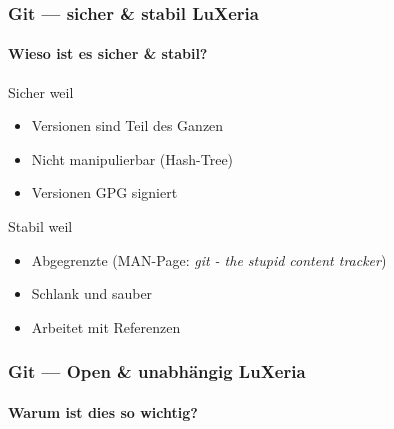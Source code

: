 \begin{frame}
	\frametitle{Git --- sicher \& stabil \hfill{} LuXeria}
	\framesubtitle{Wieso ist es sicher \& stabil?}
	\begin{block}{Sicher weil}
		\begin{itemize}
			\item Versionen sind Teil des Ganzen
			\item Nicht manipulierbar (Hash-Tree)
			\item Versionen GPG signiert
		\end{itemize}
	\end{block}
	\begin{block}{Stabil weil}
		\begin{itemize}
			\item Abgegrenzte (MAN-Page: \textit{git - the stupid content tracker})
			\item Schlank und sauber
			\item Arbeitet mit Referenzen
		\end{itemize}
	\end{block}
\end{frame}

\begin{frame}
	\frametitle{Git --- Open \& unabhängig \hfill{} LuXeria}
	\framesubtitle{Warum ist dies so wichtig?}
\end{frame}
